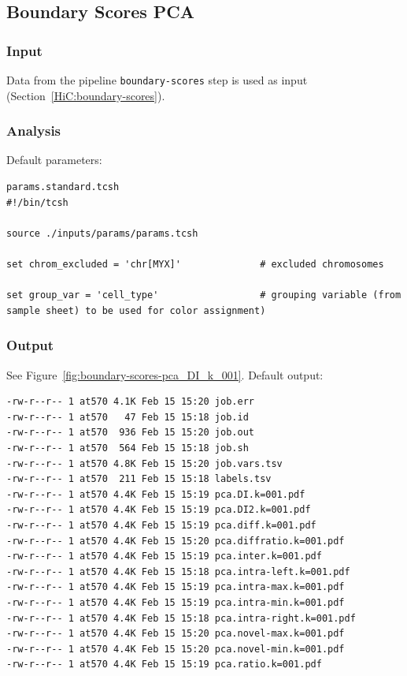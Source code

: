 \subsection{Boundary Scores PCA}\label{HiC:boundary-scores-pca}%
\subsubsection{Input} %
Data from the pipeline \texttt{boundary-scores} step is used as input (Section~\ref{HiC:boundary-scores}).
\subsubsection{Analysis} %
Default parameters:
\begin{lstlisting}
params.standard.tcsh
#!/bin/tcsh

source ./inputs/params/params.tcsh

set chrom_excluded = 'chr[MYX]'              # excluded chromosomes

set group_var = 'cell_type'                  # grouping variable (from sample sheet) to be used for color assignment)
\end{lstlisting}
\subsubsection{Output} %
See Figure~\ref{fig:boundary-scores-pca_DI_k_001}. Default output: %
\begin{lstlisting}
-rw-r--r-- 1 at570 4.1K Feb 15 15:20 job.err
-rw-r--r-- 1 at570   47 Feb 15 15:18 job.id
-rw-r--r-- 1 at570  936 Feb 15 15:20 job.out
-rw-r--r-- 1 at570  564 Feb 15 15:18 job.sh
-rw-r--r-- 1 at570 4.8K Feb 15 15:20 job.vars.tsv
-rw-r--r-- 1 at570  211 Feb 15 15:18 labels.tsv
-rw-r--r-- 1 at570 4.4K Feb 15 15:19 pca.DI.k=001.pdf
-rw-r--r-- 1 at570 4.4K Feb 15 15:19 pca.DI2.k=001.pdf
-rw-r--r-- 1 at570 4.4K Feb 15 15:19 pca.diff.k=001.pdf
-rw-r--r-- 1 at570 4.4K Feb 15 15:20 pca.diffratio.k=001.pdf
-rw-r--r-- 1 at570 4.4K Feb 15 15:19 pca.inter.k=001.pdf
-rw-r--r-- 1 at570 4.4K Feb 15 15:18 pca.intra-left.k=001.pdf
-rw-r--r-- 1 at570 4.4K Feb 15 15:19 pca.intra-max.k=001.pdf
-rw-r--r-- 1 at570 4.4K Feb 15 15:19 pca.intra-min.k=001.pdf
-rw-r--r-- 1 at570 4.4K Feb 15 15:18 pca.intra-right.k=001.pdf
-rw-r--r-- 1 at570 4.4K Feb 15 15:20 pca.novel-max.k=001.pdf
-rw-r--r-- 1 at570 4.4K Feb 15 15:20 pca.novel-min.k=001.pdf
-rw-r--r-- 1 at570 4.4K Feb 15 15:19 pca.ratio.k=001.pdf
\end{lstlisting}

